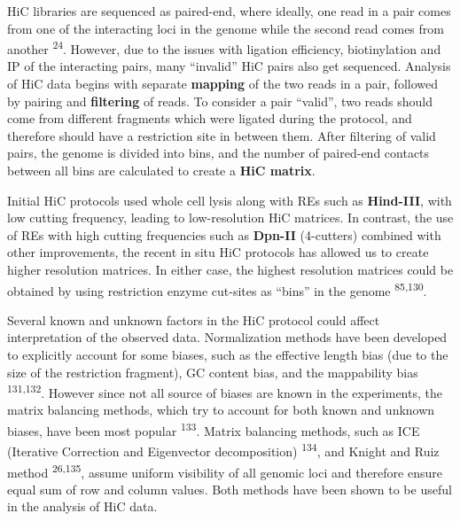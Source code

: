 \documentclass[11pt,twoside]{MPIthesis}
\theoremstyle{definition}
\theoremstyle{definition}
\theoremstyle{definition}
\theoremstyle{remark}
\begin{document}
HiC libraries are sequenced as paired-end, where ideally, one read in a
pair comes from one of the interacting loci in the genome while the
second read comes from another \textsuperscript{24}. However, due to the
issues with ligation efficiency, biotinylation and IP of the interacting
pairs, many ``invalid'' HiC pairs also get sequenced. Analysis of HiC
data begins with separate \textbf{mapping} of the two reads in a pair,
followed by pairing and \textbf{filtering} of reads. To consider a pair
``valid'', two reads should come from different fragments which were
ligated during the protocol, and therefore should have a restriction
site in between them. After filtering of valid pairs, the genome is
divided into bins, and the number of paired-end contacts between all
bins are calculated to create a \textbf{HiC matrix}.

Initial HiC protocols used whole cell lysis along with REs such as
\textbf{Hind-III}, with low cutting frequency, leading to low-resolution
HiC matrices. In contrast, the use of REs with high cutting frequencies
such as \textbf{Dpn-II} (4-cutters) combined with other improvements,
the recent in situ HiC protocols has allowed us to create higher
resolution matrices. In either case, the highest resolution matrices
could be obtained by using restriction enzyme cut-sites as ``bins'' in
the genome \textsuperscript{85,130}.

Several known and unknown factors in the HiC protocol could affect
interpretation of the observed data. Normalization methods have been
developed to explicitly account for some biases, such as the effective
length bias (due to the size of the restriction fragment), GC content
bias, and the mappability bias \textsuperscript{131,132}. However since
not all source of biases are known in the experiments, the matrix
balancing methods, which try to account for both known and unknown
biases, have been most popular \textsuperscript{133}. Matrix balancing
methods, such as ICE (Iterative Correction and Eigenvector
decomposition) \textsuperscript{134}, and Knight and Ruiz method
\textsuperscript{26,135}, assume uniform visibility of all genomic loci
and therefore ensure equal sum of row and column values. Both methods
have been shown to be useful in the analysis of HiC data.
\end{document}
